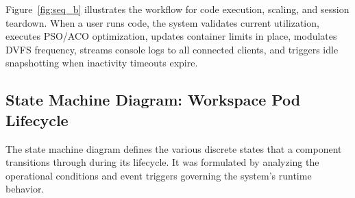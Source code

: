 \documentclass[12pt,a4paper]{report}
\begin{document}
Figure~\ref{fig:seq_b} illustrates the workflow for code execution, scaling, and session teardown. When a user runs code, the system validates current utilization, executes PSO/ACO optimization, updates container limits in place, modulates DVFS frequency, streams console logs to all connected clients, and triggers idle snapshotting when inactivity timeouts expire.

\clearpage
\subsection{State Machine Diagram: Workspace Pod Lifecycle}

The state machine diagram defines the various discrete states that a component transitions through during its lifecycle. It was formulated by analyzing the operational conditions and event triggers governing the system's runtime behavior.
\end{document}

